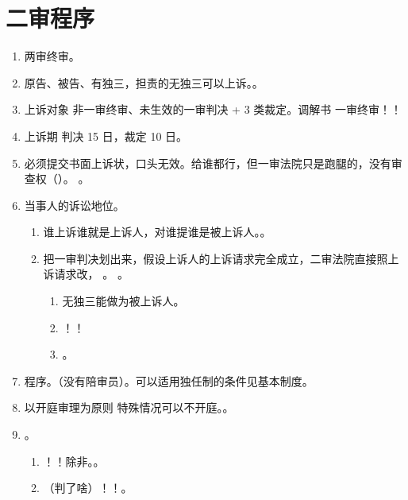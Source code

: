\section{二审程序}
\begin{enumerate}
  \item 两审终审。
  \item 原告、被告、有独三，担责的无独三可以上诉。。
  \item 上诉对象 \yjt 非一审终审、未生效的一审判决 + 3 类裁定。调解书 \yjt 一审终审！！
  \item 上诉期 \yjt 判决 15 日，裁定 10 日。
  \item 必须提交书面上诉状，口头无效。给谁都行，但一审法院只是跑腿的，没有审查权（）。
        。
  \item 当事人的诉讼地位。
        \begin{enumerate}
          \item 谁上诉谁就是上诉人，对谁提谁是被上诉人。。
          \item 把一审判决划出来，假设上诉人的上诉请求完全成立，二审法院直接照上诉请求改，
                。
                。
                \begin{enumerate}
                  \item 无独三能做为被上诉人。
                  \item {}！！
                  \item {}。
                \end{enumerate}
        \end{enumerate}
  \item 程序。（没有陪审员）。可以适用独任制的条件见基本制度。
  \item 以开庭审理为原则 \yjt 特殊情况可以不开庭。。
  \item {}。
        \begin{enumerate}
          \item {}！！除非。。
          \item {}（判了啥）！！。

\end{enumerate}
\end{enumerate}
